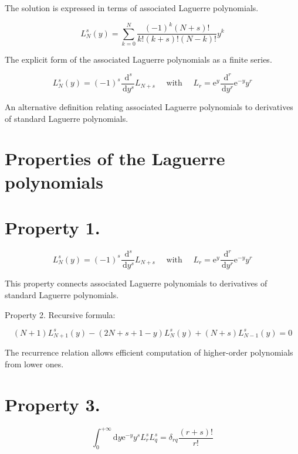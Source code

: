 The solution is expressed in terms of associated Laguerre polynomials.

\begin{equation}
L_{N}^{s}(y)=\sum_{k=0}^{N} \frac{(-1)^{k}(N+s)!}{k!(k+s)!(N-k)!} y^{k}
\end{equation}

The explicit form of the associated Laguerre polynomials as a finite series.

\begin{equation}
L_{N}^{s}(y)=(-1)^{s} \frac{\, \mathrm{d}^{s}}{\, \mathrm{d} y^{s}} L_{N+s} \quad \text { with } \quad L_{r}=\mathrm{e}^{y} \frac{\, \mathrm{d}^{r}}{\, \mathrm{d} y^{r}} \mathrm{e}^{-y} y^{r}
\end{equation}

An alternative definition relating associated Laguerre polynomials to derivatives of standard Laguerre polynomials.

\section{Properties of the Laguerre polynomials}
\section{Property 1.}

\begin{equation}
L_{N}^{s}(y)=(-1)^{s} \frac{\, \mathrm{d}^{s}}{\, \mathrm{d} y^{s}} L_{N+s} \quad \text { with } \quad L_{r}=\mathrm{e}^{y} \frac{\, \mathrm{d}^{r}}{\, \mathrm{d} y^{r}} \mathrm{e}^{-y} y^{r}
\end{equation}

This property connects associated Laguerre polynomials to derivatives of standard Laguerre polynomials.

Property 2. Recursive formula:

\begin{equation}
(N+1) L_{N+1}^{s}(y)-(2 N+s+1-y) L_{N}^{s}(y)+(N+s) L_{N-1}^{s}(y)=0
\end{equation}

The recurrence relation allows efficient computation of higher-order polynomials from lower ones.

\section{Property 3.}

\begin{equation}
\int_{0}^{+\infty} \mathrm{d} y \mathrm{e}^{-y} y^{s} L_{r}^{s} L_{q}^{s}=\delta_{r q} \frac{(r+s)!}{r!}
\end{equation}

